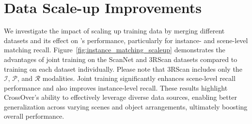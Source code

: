 \clearpage
\setcounter{section}{0}
\renewcommand{\thesection}{\Alph{section}}

\maketitlesupplementary

\begin{abstract}
In the supplementary material, we provide:
\begin{enumerate}[leftmargin=12pt,itemsep=0em]
    \item Impact of scaling up data (Sec.~\ref{sec:data_scaleup})
    \item Results on training with all pairwise modalities (Sec.~\ref{sec:all_pairwise_modality})
    \item Results on same modality scene retrieval (Sec.~\ref{sec:same_modal_scene_retrieval})
    \item Results on scene retrieval with one modality input to the scene-level encoder (Sec.~\ref{sec:scene_encoder_avg})
    \item Results on cross-modal coarse visual localization (Sec.~\ref{sec:sgloc_compare})
    \item Additional qualitative results on scene retrieval (Sec.~\ref{sec:qualitative_res})
    \item Details on the camera view sampling algorithm (Sec.~\ref{sec:cam_view_sampling})
    \item Analysis of inference runtime (Sec.~\ref{sec:runtime_analysis})
    \item Further details on the experimental setup (Sec.~\ref{sec:exp_details})

\end{enumerate}
\end{abstract}

\section{Data Scale-up Improvements}
\label{sec:data_scaleup}
We investigate the impact of scaling up training data by merging different datasets and its effect on \project{}'s performance, particularly for instance- and scene-level matching recall. Figure~\ref{fig:instance_matching_scaleup} demonstrates the advantages of joint training on the ScanNet and 3RScan datasets compared to training on each dataset individually. Please note that 3RScan includes only the $\mathcal{I}$, $\mathcal{P}$, and $\mathcal{R}$ modalities. Joint training significantly enhances scene-level recall performance and also improves instance-level recall. These results highlight CrossOver's ability to effectively leverage diverse data sources, enabling better generalization across varying scenes and object arrangements, ultimately boosting overall performance.


